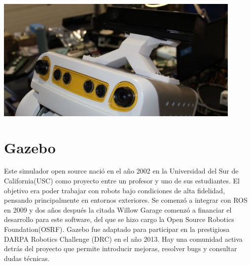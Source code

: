 \documentclass[12pt,spanish,chapterprefix, numbers=noenddot]{book}
\numberwithin{equation}{section}
\numberwithin{figure}{section}
\begin{document}
\begin{center}
\includegraphics[width=12cm]{Figs/kinect.jpg}
\end{center}


\section{Gazebo}
Este simulador open source nació en el año 2002 en la Universidad del Sur de California(USC) como proyecto entre un profesor y uno de sus estudiantes. El objetivo era poder trabajar con robots bajo condiciones de alta fidelidad, pensando principalmente en entornos exteriores. Se comenzó a integrar con ROS en 2009 y dos años después la citada Willow Garage comenzó a financiar el desarrollo para este software, del que se hizo cargo la Open Source Robotics Foundation(OSRF).
Gazebo fue adaptado para participar en la prestigiosa DARPA Robotics Challenge (DRC) en el año 2013. Hay una comunidad activa detrás del proyecto que permite introducir mejoras, resolver bugs y consultar dudas técnicas.
\end{document}

